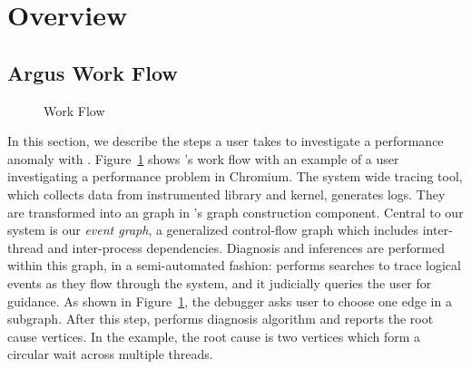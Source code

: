 \section{Overview}\label{sec:overview}

\subsection{Argus Work Flow}
\begin{figure}[tb]
    \centering
	
    \caption{\xxx Work Flow}
    \label{fig:argus-overview}
\end{figure}

In this section, we describe the steps a user takes to investigate a performance
anomaly with \xxx. Figure~\ref{fig:argus-overview} shows \xxx's work flow with
an example of a user investigating a performance problem in Chromium. The
system wide tracing tool, which collects data from \xxx instrumented library
and kernel, generates logs. They are transformed into an graph in \xxx's graph
construction component. Central to our system is our \emph{event graph}, a
generalized control-flow graph which includes inter-thread and inter-process
dependencies. Diagnosis and inferences are performed within this graph, in a
semi-automated fashion: \xxx performs searches to trace logical events as they
flow through the system, and it judicially queries the user for guidance.
As shown in Figure~\ref{fig:argus-overview}, the debugger asks user to choose
one edge in a subgraph. After this step, \xxx performs diagnosis algorithm and
reports the root cause vertices. In the example, the root cause is two vertices
which form a circular wait across multiple threads.
%
%


